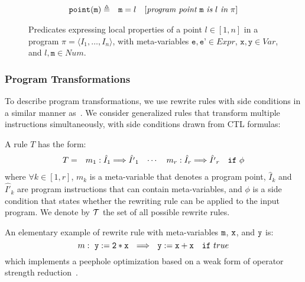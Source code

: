 \begin{figure}[!ht]
\begin{small}
\begin{eqnarray*}
\text{${\tt point}$}(\texttt{m}) & \triangleq & \texttt{m}=l ~~~ [\textit{program point} ~ \text{${\tt m}$} ~ \textit{is} ~ l ~ \textit{in} ~ \pi]
\end{eqnarray*}
\vspace{-4mm}
\end{small}
\caption{\label{fig:osr-loc-pred}Predicates expressing local properties of a point $l\in [1,n]$ in a program $\pi=\langle I_1,\ldots,I_n\rangle$, with meta-variables $\texttt{e},\texttt{e'}\in Expr$, $\texttt{x}, \texttt{y}\in Var$, and $l, \texttt{m}\in Num$.}
\end{figure}

\subsubsection*{Program Transformations}

To describe program transformations, we use rewrite rules with side conditions in a similar manner as~\cite{Lacey04,Kundu09}. We consider generalized rules that transform multiple instructions simultaneously, with side conditions drawn from CTL formulas:

\begin{definition}
\label{de:rewrite-rule}
A rule $T$ has the form:
\vspace{-1mm}
\begin{equation*}
\begin{array}{lllll}
T = & m_1: \hat{I}_1 \Longrightarrow \hat{I'}_1 %
& \cdots
& m_r: \hat{I}_r \Longrightarrow \hat{I'}_r
& {\tt if} ~ \phi
\end{array}
\vspace{-1mm}
\end{equation*}
\noindent where $\forall k\in[1,r]$, $m_k$ is a meta-variable that denotes a program point, $\hat{I}_k$ and $\hat{I'}_k$ are program instructions that can contain meta-variables, and $\phi$ is a side condition that states whether the rewriting rule can be applied to the input program. We denote by $\mathcal{T}$ the set of all possible rewrite rules.
\end{definition}

\noindent An elementary example of rewrite rule with meta-variables $\text{${\tt m}$}$, $\text{${\tt x}$}$, and $\text{${\tt y}$}$ is: $$m: ~ {\tt y:=2*x} ~~ \Longrightarrow ~~ {\tt y:=x+x} ~~~ {\tt if} ~ true$$ which implements a peephole optimization based on a weak form of operator strength reduction~\cite{Cooper01}.

